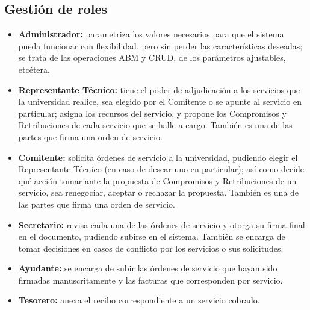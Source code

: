 \subsection*{Gesti\'on de roles}
\begin{itemize}
	\item \textbf{Administrador:} parametriza los
	valores necesarios para que el sistema pueda
	funcionar con flexibilidad, pero sin perder
	las caracter\'isticas deseadas; se trata de
	las operaciones ABM y CRUD, de los
	par\'ametros ajustables, etcétera.
	\item \textbf{Representante T\'ecnico:} tiene
	el poder de adjudicaci\'on a los servicios
	que la universidad realice, sea elegido por
	el Comitente o se apunte al servicio en
	particular; asigna los recursos del servicio,
	y propone los Compromisos y Retribuciones
	de cada servicio que se halle a cargo. Tambi\'en
	es una de las partes que firma una orden de
	servicio.
	\item \textbf{Comitente:} solicita \'ordenes
	de servicio a la universidad, pudiendo elegir
	el Representante T\'ecnico (en caso de desear
	uno en particular); as\'i como decide qu\'e
	acci\'on tomar ante la propuesta de Compromisos
	y Retribuciones de un servicio, sea renegociar,
	aceptar o rechazar la propuesta. Tambi\'en es
	una de las partes que firma una orden de
	servicio.
	\item \textbf{Secretario:} revisa cada una de
	las \'ordenes de servicio y otorga su firma
	final en el documento, pudiendo subirse en
	el sistema. Tambi\'en se encarga de tomar
	decisiones en casos de conflicto por los
	servicios o sus solicitudes.
	\item \textbf{Ayudante:} se encarga de subir
	las \'ordenes de servicio que hayan sido
	firmadas manuscritamente y las facturas que
	corresponden por servicio.
	\item \textbf{Tesorero:} anexa el recibo
	correspondiente a un servicio cobrado.
\end{itemize}
\newpage
{}
